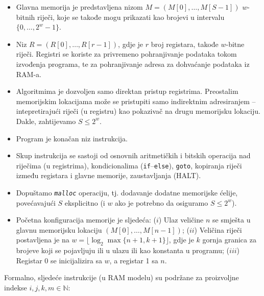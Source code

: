 \begin{itemize}
	\item Glavna memorija je predstavljena nizom $M = (M[0], \ldots, M[S-1])$  $w$-bitnih riječi, koje se takođe mogu prikazati kao brojevi u intervalu
 $\{0,\ldots , 2^w - 1\}$.
 	\item Niz $R = (R[0], \ldots , R[r - 1])$,  gdje je $r$ broj registara, takođe $w$-bitne riječi. Registri se koriste za privremeno pohranjivanje podataka tokom izvođenja programa, te za pohranjivanje adresa za dohvaćanje podataka iz RAM-a. %
 	
 	\item Algoritmima je dozvoljen samo direktan pristup registrima. Preostalim memorijskim lokacijama može se pristupiti samo
 	indirektnim adresira\-njem -- intepretirajući riječi (u registru) kao pokazivač na drugu memo\-rijsku lokaciju. Dakle, zahtijevamo
 	$S \leq  2^w$.
 	\item Program je konačan niz instrukcija.
 	\item Skup instrukcija se sastoji od osnovnih aritmetičkih i bitskih operacija nad riječima (u registrima), kondicionalima
 	(\texttt{if}--\texttt{else}), \texttt{goto}, kopiranja riječi između registara i glavne memorije, zaustavljanja (HALT).
 	\item Dopuštamo \texttt{\textit{malloc}} operaciju, tj. dodavanje dodatne memorijske ćelije, povećavajući $S$ eksplicitno (i $w$ ako je potrebno da osiguramo $S \leq 2^w$).
 	\item Početna konfiguracija memorije je sljedeća:
 	($i$) Ulaz veličine $n$ se smješta  u glavnu memorijsku lokaciju $(M[0],\ldots , M[n - 1])$; ($ii$) Veličina riječi postavljena je na $w = \lfloor \log_2 \max\{n + 1, k + 1\} \rfloor $, gdje je $k$ gornja granica za brojeve koji se
 	pojavljuju ili u ulazu ili kao konstanta u programu; ($iii$) Registar 0 se inicijalizira sa $w$, a registar 1 sa $n$.
 \end{itemize}

Formalno, sljedeće instrukcije (u RAM modelu) su podržane za proizvoljne indekse $i, j, k, m \in \mathbb{N} $:

%

